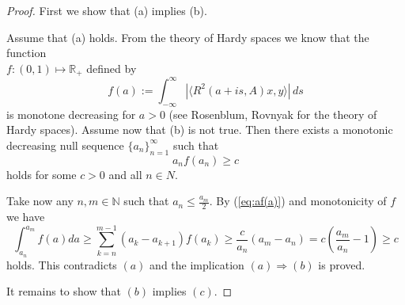 \documentclass[11pt,intlimits, draft,oneside]{amsart}
\theoremstyle{definition}
\def\dd{\,d}
\def\RR{\mathbb{R}}
\def\NN{\mathbb{N}}
\begin{document}
\begin{proof}
First we show that (a) implies (b).

Assume that (a) holds. From the theory of Hardy spaces we know that the function \\
$f:(0,1)\mapsto \RR_+$ defined by
\begin{equation*}
f(a):=\int_{-\infty}^{\infty} | \langle R^2(a+is,A)x,y
\rangle | \dd s\end{equation*} is monotone decreasing for $a>0$ (see Rosenblum, Rovnyak
\cite{rosenblum/rovnyak:1994} for the theory of Hardy spaces). 
%
Assume now that (b) is not true. Then there exists a monotonic decreasing null sequence $\{a_n\}_{n=1}^\infty$
such that 
\begin{equation}\label{eq:af(a)}
a_n
f(a_n)
\geq c \end{equation}
holds for some $c>0$ and all $n\in N$. 

Take now any $n,m\in \NN$ such that $a_n\leq \frac{a_m}{2}$. 
By (\ref{eq:af(a)}) and monotonicity of $f$ we have
%
\begin{equation*}
\int_{a_n}^{a_m}f(a)da \geq \sum_{k=n}^{m-1}(a_k-a_{k+1})f(a_k)
\geq \frac{c}{a_n} (a_m - a_n)=c \left(\frac{a_m}{a_n}-1\right)\geq c 
\end{equation*}
holds. This contradicts $(a)$ and the implication $(a)\Rightarrow (b)$ is proved.
%

It remains to show that $(b)$ implies $(c)$.


\end{proof}
\end{document}
